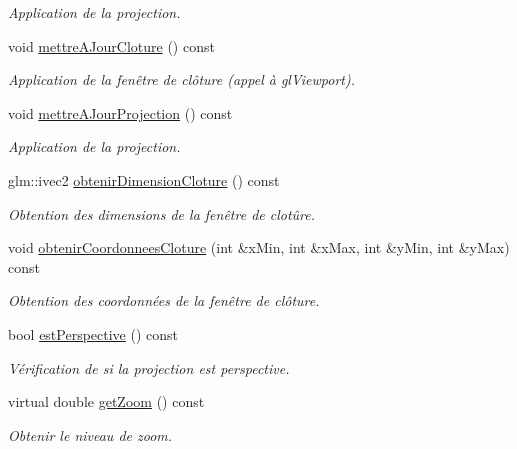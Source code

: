 \begin{DoxyCompactItemize}
\begin{DoxyCompactList}\small\item\em Application de la projection. \end{DoxyCompactList}\item 
void \hyperlink{classvue_1_1_projection_a0a4499967128947206cd3fc34c2b3b20}{mettre\-A\-Jour\-Cloture} () const 
\begin{DoxyCompactList}\small\item\em Application de la fenêtre de clôture (appel à gl\-Viewport). \end{DoxyCompactList}\item 
void \hyperlink{classvue_1_1_projection_abe8290f07564c7b63be04af8c5f68acb}{mettre\-A\-Jour\-Projection} () const 
\begin{DoxyCompactList}\small\item\em Application de la projection. \end{DoxyCompactList}\item 
glm\-::ivec2 \hyperlink{classvue_1_1_projection_aeb123186d5d5816dc09099bfc18f85bf}{obtenir\-Dimension\-Cloture} () const 
\begin{DoxyCompactList}\small\item\em Obtention des dimensions de la fenêtre de clotûre. \end{DoxyCompactList}\item 
void \hyperlink{classvue_1_1_projection_a2e2d21fa9455e872ad27980d0ba80e4b}{obtenir\-Coordonnees\-Cloture} (int \&x\-Min, int \&x\-Max, int \&y\-Min, int \&y\-Max) const 
\begin{DoxyCompactList}\small\item\em Obtention des coordonnées de la fenêtre de clôture. \end{DoxyCompactList}\item 
bool \hyperlink{classvue_1_1_projection_a3d9b70124ec0b3ed22299158abc4067c}{est\-Perspective} () const 
\begin{DoxyCompactList}\small\item\em Vérification de si la projection est perspective. \end{DoxyCompactList}\item 
virtual double \hyperlink{classvue_1_1_projection_aa672638986849570e19ac3885366ce12}{get\-Zoom} () const 
\begin{DoxyCompactList}\small\item\em Obtenir le niveau de zoom. \end{DoxyCompactList}\end{DoxyCompactItemize}
